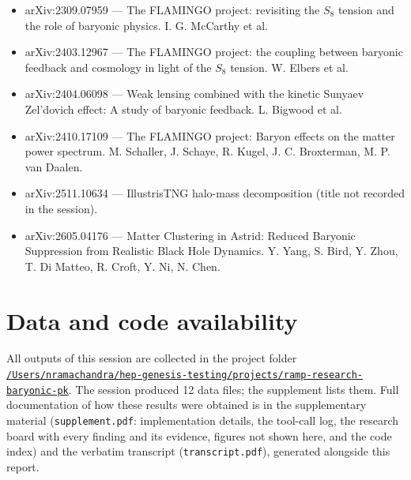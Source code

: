 \documentclass[11pt,a4paper]{article}
\begin{document}
\begin{itemize}
\item arXiv:2309.07959 --- The FLAMINGO project: revisiting the $S_8$ tension and the role of baryonic physics. I. G. McCarthy et al.
\item arXiv:2403.12967 --- The FLAMINGO project: the coupling between baryonic feedback and cosmology in light of the $S_8$ tension. W. Elbers et al.
\item arXiv:2404.06098 --- Weak lensing combined with the kinetic Sunyaev Zel'dovich effect: A study of baryonic feedback. L. Bigwood et al.
\item arXiv:2410.17109 --- The FLAMINGO project: Baryon effects on the matter power spectrum. M. Schaller, J. Schaye, R. Kugel, J. C. Broxterman, M. P. van Daalen.
\item arXiv:2511.10634 --- IllustrisTNG halo-mass decomposition (title not recorded in the session).
\item arXiv:2605.04176 --- Matter Clustering in Astrid: Reduced Baryonic Suppression from Realistic Black Hole Dynamics. Y. Yang, S. Bird, Y. Zhou, T. Di Matteo, R. Croft, Y. Ni, N. Chen.
\end{itemize}

\section*{Data and code availability}
All outputs of this session are collected in the project folder \href{file:///Users/nramachandra/hep-genesis-testing/projects/ramp-research-baryonic-pk}{\texttt{/\allowbreak{}Users/\allowbreak{}nramachandra/\allowbreak{}hep-genesis-testing/\allowbreak{}projects/\allowbreak{}ramp-research-baryonic-pk}}.
The session produced 12 data files; the supplement lists them.
Full documentation of how these results were obtained is in the supplementary material (\texttt{supplement.pdf}: implementation details, the tool-call log, the research board with every finding and its evidence, figures not shown here, and the code index) and the verbatim transcript (\texttt{transcript.pdf}), generated alongside this report.
\end{document}
